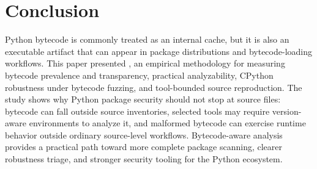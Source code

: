 \section{Conclusion}\label{sec:conclude}

Python bytecode is commonly treated as an internal cache, but it is also an executable artifact that can appear in package distributions and bytecode-loading workflows.  This paper presented {\tech}, an empirical methodology for measuring bytecode prevalence and transparency, practical analyzability, CPython robustness under bytecode fuzzing, and tool-bounded source reproduction.  The study shows why Python package security should not stop at source files: bytecode can fall outside source inventories, selected tools may require version-aware environments to analyze it, and malformed bytecode can exercise runtime behavior outside ordinary source-level workflows.  Bytecode-aware analysis provides a practical path toward more complete package scanning, clearer robustness triage, and stronger security tooling for the Python ecosystem.
